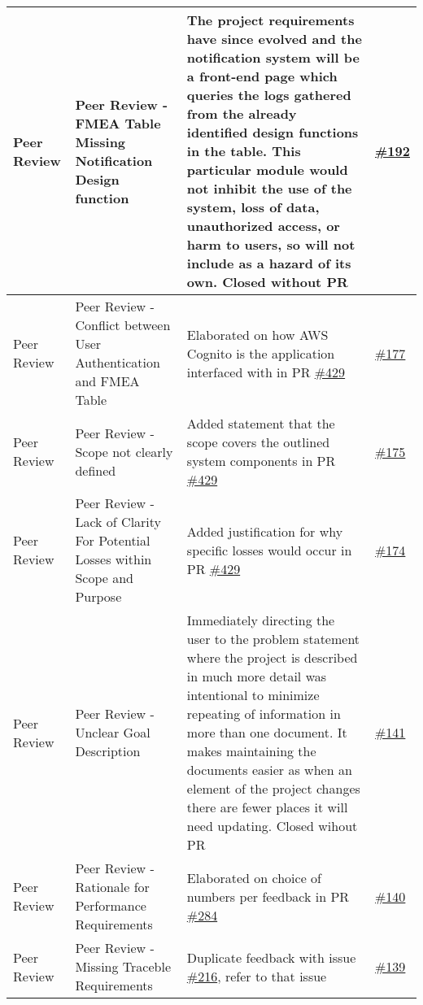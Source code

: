 \documentclass{article}
\begin{document}
\begin{longtable}{|m{3cm}|m{3cm}|m{5cm}|m{1cm}|}
\hline
Peer Review & Peer Review - FMEA Table Missing Notification Design function & The project requirements have
 since evolved and the notification system
 will be a front-end page which queries the logs gathered from the already identified design functions in the table.
This particular module would not inhibit the use of the system,
 loss of data, unauthorized access, or harm to users, so will not include as a hazard of its own. Closed without PR & \href{https://github.com/Spitgranger/SyncMaster/pull/192}{\#192} \\
 \hline
 Peer Review & Peer Review - Conflict between User Authentication and FMEA Table & Elaborated on how AWS Cognito is the application interfaced with
 in PR \href{https://github.com/Spitgranger/SyncMaster/pull/429}{\#429} & \href{https://github.com/Spitgranger/SyncMaster/pull/177}{\#177} \\
 \hline
 Peer Review & Peer Review - Scope not clearly defined & Added statement that the scope covers the outlined system components in PR \href{https://github.com/Spitgranger/SyncMaster/pull/429}{\#429}
 & \href{https://github.com/Spitgranger/SyncMaster/pull/175}{\#175} \\
 \hline
 Peer Review & Peer Review - Lack of Clarity For Potential Losses within Scope and Purpose & Added justification for why specific losses 
 would occur in PR \href{https://github.com/Spitgranger/SyncMaster/pull/429}{\#429} & \href{https://github.com/Spitgranger/SyncMaster/pull/174}{\#174}\\
 \hline
 Peer Review & Peer Review - Unclear Goal Description & Immediately directing the user to the problem statement where the project is described in much 
 more detail was intentional to minimize repeating of information in more than one document. 
 It makes maintaining the documents easier as when an element of the project changes there are fewer places it will need updating. Closed wihout PR
 & \href{https://github.com/Spitgranger/SyncMaster/pull/141}{\#141}\\
 \hline
 Peer Review & Peer Review - Rationale for Performance Requirements & Elaborated on choice of numbers per feedback in PR \href{https://github.com/Spitgranger/SyncMaster/pull/284}{\#284} 
 & \href{https://github.com/Spitgranger/SyncMaster/pull/140}{\#140}\\
 \hline
 Peer Review & Peer Review - Missing Traceble Requirements & Duplicate feedback with issue \href{https://github.com/Spitgranger/SyncMaster/pull/216}{\#216}, refer to that issue 
 & \href{https://github.com/Spitgranger/SyncMaster/pull/139}{\#139}\\

\end{longtable}
\end{document}
